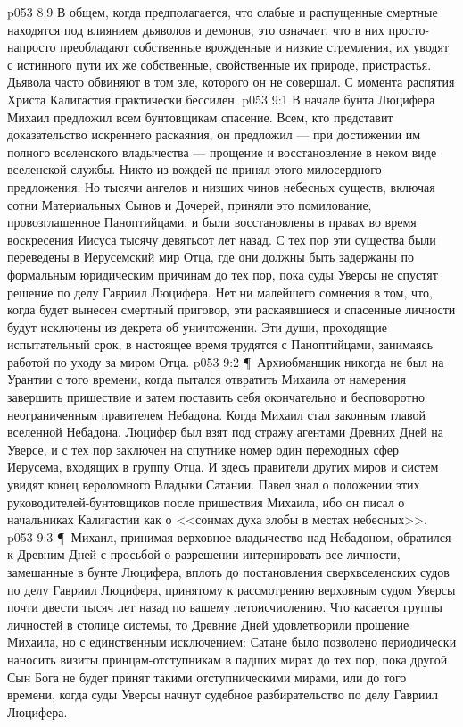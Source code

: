 \vs p053 8:9 В общем, когда предполагается, что слабые и распущенные смертные находятся под влиянием дьяволов и демонов, это означает, что в них просто\hyp{}напросто преобладают собственные врожденные и низкие стремления, их уводят с истинного пути их же собственные, свойственные их природе, пристрастья. Дьявола часто обвиняют в том зле, которого он не совершал. С момента распятия Христа Калигастия практически бессилен.
\vs p053 9:1 В начале бунта Люцифера Михаил предложил всем бунтовщикам спасение. Всем, кто представит доказательство искреннего раскаяния, он предложил --- при достижении им полного вселенского владычества --- прощение и восстановление в неком виде вселенской службы. Никто из вождей не принял этого милосердного предложения. Но тысячи ангелов и низших чинов небесных существ, включая сотни Материальных Сынов и Дочерей, приняли это помилование, провозглашенное Паноптийцами, и были восстановлены в правах во время воскресения Иисуса тысячу девятьсот лет назад. С тех пор эти существа были переведены в Иерусемский мир Отца, где они должны быть задержаны по формальным юридическим причинам до тех пор, пока суды Уверсы не спустят решение по делу Гавриил  Люцифера. Нет ни малейшего сомнения в том, что, когда будет вынесен смертный приговор, эти раскаявшиеся и спасенные личности будут исключены из декрета об уничтожении. Эти души, проходящие испытательный срок, в настоящее время трудятся с Паноптийцами, занимаясь работой по уходу за миром Отца.
\vs p053 9:2 \P\ Архиобманщик никогда не был на Урантии с того времени, когда пытался отвратить Михаила от намерения завершить пришествие и затем поставить себя окончательно и бесповоротно неограниченным правителем Небадона. Когда Михаил стал законным главой вселенной Небадона, Люцифер был взят под стражу агентами Древних Дней на Уверсе, и с тех пор заключен на спутнике номер один переходных сфер Иерусема, входящих в группу Отца. И здесь правители других миров и систем увидят конец вероломного Владыки Сатании. Павел знал о положении этих руководителей\hyp{}бунтовщиков после пришествия Михаила, ибо он писал о начальниках Калигастии как о <<сонмах духа злобы в местах небесных>>.
\vs p053 9:3 \P\ Михаил, принимая верховное владычество над Небадоном, обратился к Древним Дней с просьбой о разрешении интернировать все личности, замешанные в бунте Люцифера, вплоть до постановления сверхвселенских судов по делу Гавриил  Люцифера, принятому к рассмотрению верховным судом Уверсы почти двести тысяч лет назад по вашему летоисчислению. Что касается группы личностей в столице системы, то Древние Дней удовлетворили прошение Михаила, но с единственным исключением: Сатане было позволено периодически наносить визиты принцам\hyp{}отступникам в падших мирах до тех пор, пока другой Сын Бога не будет принят такими отступническими мирами, или до того времени, когда суды Уверсы начнут судебное разбирательство по делу Гавриил  Люцифера.
